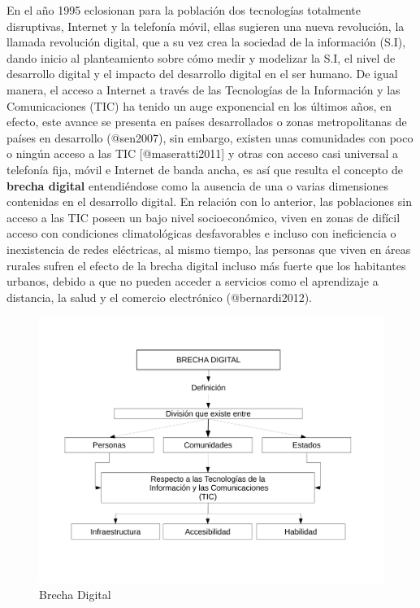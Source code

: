\documentclass[]{article}
\begin{document}
En el año 1995 eclosionan para la población dos tecnologías totalmente
disruptivas, Internet y la telefonía móvil, ellas sugieren una nueva
revolución, la llamada revolución digital, que a su vez crea la sociedad
de la información (S.I), dando inicio al planteamiento sobre cómo medir
y modelizar la S.I, el nivel de desarrollo digital y el impacto del
desarrollo digital en el ser humano. De igual manera, el acceso a
Internet a través de las Tecnologías de la Información y las
Comunicaciones (TIC) ha tenido un auge exponencial en los últimos años,
en efecto, este avance se presenta en países desarrollados o zonas
metropolitanas de países en desarrollo (@sen2007), sin embargo, existen
unas comunidades con poco o ningún acceso a las TIC {[}@maseratti2011{]}
y otras con acceso casi universal a telefonía fija, móvil e Internet de
banda ancha, es así que resulta el concepto de \textbf{brecha digital}
entendiéndose como la ausencia de una o varias dimensiones contenidas en
el desarrollo digital. En relación con lo anterior, las poblaciones sin
acceso a las TIC poseen un bajo nivel socioeconómico, viven en zonas de
difícil acceso con condiciones climatológicas desfavorables e incluso
con ineficiencia o inexistencia de redes eléctricas, al mismo tiempo,
las personas que viven en áreas rurales sufren el efecto de la brecha
digital incluso más fuerte que los habitantes urbanos, debido a que no
pueden acceder a servicios como el aprendizaje a distancia, la salud y
el comercio electrónico (@bernardi2012).

\begin{figure}
\centering
\includegraphics{imagen_brdigital.pdf}
\caption{Brecha Digital}
\end{figure}
\end{document}
